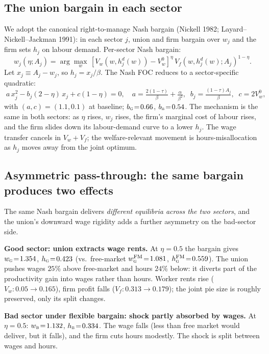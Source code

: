 \documentclass[9pt,a4paper]{extarticle}
\begin{document}
\subsection{The union bargain in each sector}
We adopt the canonical right-to-manage Nash bargain (Nickell 1982;
Layard--Nickell--Jackman 1991): in each sector $j$, union and firm
bargain over $w_j$ and the firm sets $h_j$ on labour demand. Per-sector
Nash bargain:
\[
w_j(\eta;A_j)=\arg\max_w\,[V_w(w,h_j^d(w))-V_w^0]^{\eta}\,
V_f(w,h_j^d(w);A_j)^{1-\eta}.
\]
Let $x_j\!\equiv\!A_j-w_j$, so $h_j\!=\!x_j/\beta$. The Nash FOC
reduces to a sector-specific quadratic:
\begin{equation}
\boxed{\;a\,x_j^2-b_j(2-\eta)\,x_j+c(1-\eta)=0,
\quad a=\tfrac{2(1-\tau)}{\beta}+\tfrac{\alpha}{\beta^2},
\;\; b_j=\tfrac{(1-\tau)A_j}{\beta},
\;\; c=2V_w^0,\;}
\label{eq:rtm-quadratic}
\end{equation}
with $(a, c)\!=\!(1.1, 0.1)$ at baseline; $b_{\textsc{g}}\!=\!0.66$,
$b_{\textsc{b}}\!=\!0.54$. The mechanism is the same in both sectors:
as $\eta$ rises, $w_j$ rises, the firm's marginal cost of labour
rises, and the firm slides down its labour-demand curve to a lower
$h_j$. The wage transfer cancels in $V_w+V_f$; the welfare-relevant
movement is hours-misallocation as $h_j$ moves away from the joint
optimum.

\subsection{Asymmetric pass-through: the same bargain produces two effects}
The same Nash bargain delivers \emph{different equilibria across the
two sectors}, and the union's downward wage rigidity adds a further
asymmetry on the bad-sector side.

\textbf{Good sector: union extracts wage rents.} At $\eta\!=\!0.5$
the bargain gives $w_{\textsc{g}}\!=\!1.354$, $h_{\textsc{g}}\!=\!0.423$
(vs.\ free-market $w^{\rm FM}_{\textsc{g}}\!=\!1.081$,
$h^{\rm FM}_{\textsc{g}}\!=\!0.559$). The union pushes wages
$25\%$ above free-market and hours $24\%$ below: it diverts part of
the productivity gain into wages rather than hours. Worker rents
rise ($V_w\!:\!0.05\!\to\!0.165$), firm profit falls
($V_f\!:\!0.313\!\to\!0.179$); the joint pie size is roughly
preserved, only its split changes.

\textbf{Bad sector under flexible bargain: shock partly absorbed by
wages.} At $\eta\!=\!0.5$: $w_{\textsc{b}}\!=\!1.132$,
$h_{\textsc{b}}\!=\!0.334$. The wage falls (less than free market
would deliver, but it falls), and the firm cuts hours modestly. The
shock is split between wages and hours.
\end{document}
